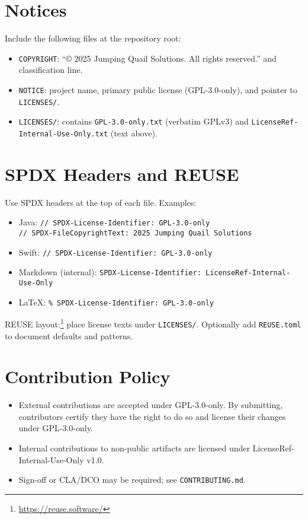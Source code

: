 \documentclass[11pt]{article}
\begin{document}
\section*{Notices}
Include the following files at the repository root:
\begin{itemize}[leftmargin=*]
  \item \texttt{COPYRIGHT}: ``© 2025 Jumping Quail Solutions. All rights reserved.'' and classification line.
  \item \texttt{NOTICE}: project name, primary public license (GPL-3.0-only), and pointer to \texttt{LICENSES/}.
  \item \texttt{LICENSES/}: contains \texttt{GPL-3.0-only.txt} (verbatim GPLv3) and \texttt{LicenseRef-Internal-Use-Only.txt} (text above).
\end{itemize}

\section*{SPDX Headers and REUSE}\label{sec:spdx}
Use SPDX headers at the top of each file. Examples:
\begin{itemize}[leftmargin=*]
  \item Java: \verb|// SPDX-License-Identifier: GPL-3.0-only|\\
        \verb|// SPDX-FileCopyrightText: 2025 Jumping Quail Solutions|
  \item Swift: \verb|// SPDX-License-Identifier: GPL-3.0-only|
  \item Markdown (internal): \verb|SPDX-License-Identifier: LicenseRef-Internal-Use-Only|
  \item LaTeX: \verb|% SPDX-License-Identifier: GPL-3.0-only|
\end{itemize}
REUSE layout:\footnote{\url{https://reuse.software/}} place license texts under \texttt{LICENSES/}. Optionally add \texttt{REUSE.toml} to document defaults and patterns.

\section*{Contribution Policy}
\begin{itemize}[leftmargin=*]
  \item External contributions are accepted under GPL-3.0-only. By submitting, contributors certify they have the right to do so and license their changes under GPL-3.0-only.
  \item Internal contributions to non-public artifacts are licensed under LicenseRef-Internal-Use-Only v1.0.
  \item Sign-off or CLA/DCO may be required; see \texttt{CONTRIBUTING.md}.
\end{itemize}
\end{document}
